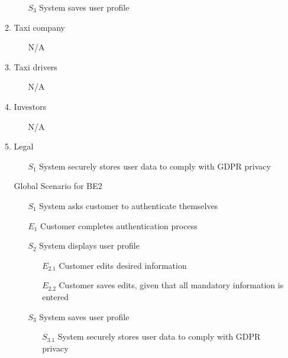 \documentclass[]{article}
\begin{document}
\begin{enumerate}[{\textbf{BE}}1.]
\begin{enumerate}[{VP2}.1]
\begin{enumerate}
\begin{enumerate}
                \end{enumerate}
                \item[$S_3$] System saves user profile
            \end{enumerate}
        \item Taxi company
            \begin{enumerate}
                \item[N/A]
            \end{enumerate}
        \item Taxi drivers
            \begin{enumerate}
                \item[N/A]
            \end{enumerate}
        \item Investors
            \begin{enumerate}
                \item[N/A]
            \end{enumerate}
        \item Legal
            \begin{enumerate}
                \item[$S_1$] System securely stores user data to comply with GDPR privacy
            \end{enumerate}
        \item[Global] Scenario for BE2
            \begin{enumerate}
                \item[$S_1$] System asks customer to authenticate themselves
                    \item[$E_1$] Customer completes authentication process
                \item[$S_2$] System displays user profile
                \begin{enumerate}
                    \item[$E_{2.1}$] Customer edits desired information
                    \item[$E_{2.2}$] Customer saves edits, given that all mandatory information is entered
                \end{enumerate}
                \item[$S_3$] System saves user profile
                \begin{enumerate}
                    \item[$S_{3.1}$] System securely stores user data to comply with GDPR privacy
                \end{enumerate}

\end{enumerate}
\end{enumerate}
\end{enumerate}
\end{document}
